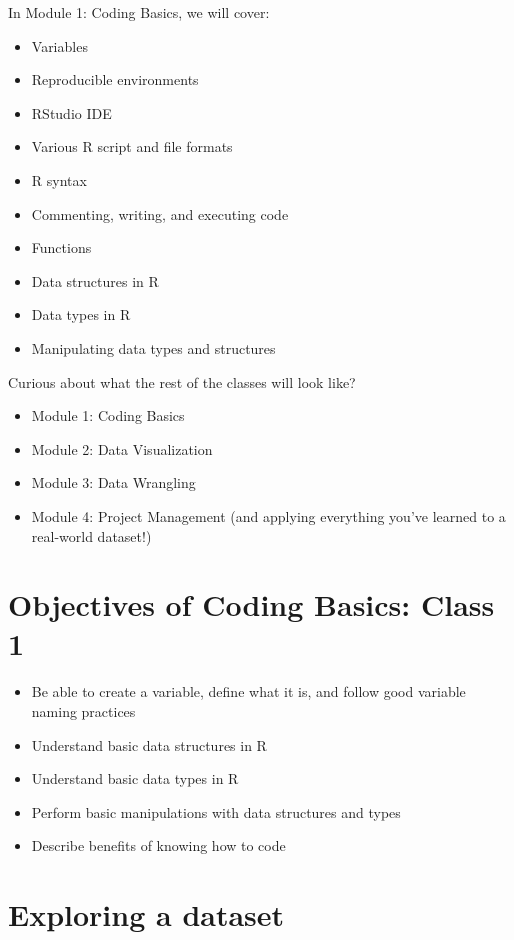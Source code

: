 \documentclass[
  letterpaper,
  DIV=11,
  numbers=noendperiod]{scrreprt}
\providecommand{\tightlist}{%
  \setlength{\itemsep}{0pt}\setlength{\parskip}{0pt}}\usepackage{longtable,booktabs,array}
\begin{document}
In Module 1: Coding Basics, we will cover:

\begin{itemize}
\tightlist
\item
  Variables
\item
  Reproducible environments
\item
  RStudio IDE
\item
  Various R script and file formats
\item
  R syntax
\item
  Commenting, writing, and executing code
\item
  Functions
\item
  Data structures in R
\item
  Data types in R
\item
  Manipulating data types and structures
\end{itemize}

Curious about what the rest of the classes will look like?

\begin{itemize}
\item
  Module 1: Coding Basics
\item
  Module 2: Data Visualization
\item
  Module 3: Data Wrangling
\item
  Module 4: Project Management (and applying everything you've learned
  to a real-world dataset!)
\end{itemize}

\section{Objectives of Coding Basics: Class
1}\label{objectives-of-coding-basics-class-1}

\begin{itemize}
\item
  Be able to create a variable, define what it is, and follow good
  variable naming practices
\item
  Understand basic data structures in R
\item
  Understand basic data types in R
\item
  Perform basic manipulations with data structures and types
\item
  Describe benefits of knowing how to code
\end{itemize}

\section{Exploring a dataset}\label{exploring-a-dataset}
\end{document}
